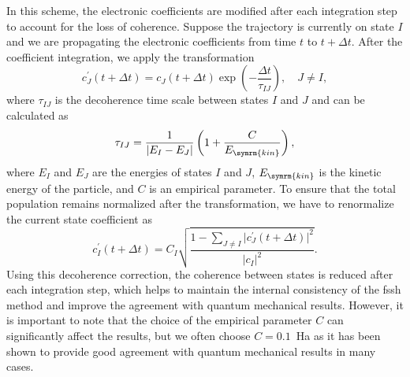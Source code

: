 In this scheme, the electronic coefficients are modified after each integration step to account for the loss of coherence. Suppose the trajectory is currently on state $I$ and we are propagating the electronic coefficients from time $t$ to $t+\Delta t$. After the coefficient integration, we apply the transformation
\begin{equation}\label{eq:granucci_persico_decoherence}
c^\prime_J(t+\Delta t)=c_J(t+\Delta t)\exp\left(-\frac{\Delta t}{\tau_{IJ}}\right),\quad J\neq I,
\end{equation}
where $\tau_{IJ}$ is the decoherence time scale between states $I$ and $J$ and can be calculated as
\begin{equation}\label{eq:granucci_persico_decoherence_time_scale}
\tau_{IJ}=\frac{1}{\lvert E_I-E_J\rvert}\left(1+\frac{C}{E_{\symrm{kin}}}\right),
\end{equation}
where $E_I$ and $E_J$ are the energies of states $I$ and $J$, $E_{\symrm{kin}}$ is the kinetic energy of the particle, and $C$ is an empirical parameter. To ensure that the total population remains normalized after the transformation, we have to renormalize the current state coefficient as
\begin{equation}\label{eq:granucci_persico_decoherence_renormalization}
c^\prime_I(t+\Delta t)=C_I\sqrt{\frac{1-\sum_{J\neq I}\lvert c^\prime_J(t+\Delta t)\rvert^2}{\lvert c_I\rvert^2}}.
\end{equation}
Using this decoherence correction, the coherence between states is reduced after each integration step, which helps to maintain the internal consistency of the \acrshort{fssh} method and improve the agreement with quantum mechanical results. However, it is important to note that the choice of the empirical parameter $C$ can significantly affect the results, but we often choose $C=0.1$~Ha as it has been shown to provide good agreement with quantum mechanical results in many cases.\supercite{10.1063/1.1793991}
